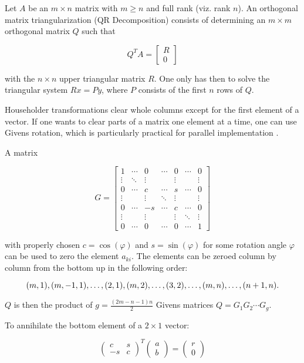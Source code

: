 \documentclass{article}
\begin{document}
Let $A$ be an $m \times n$ matrix with $m \ge n$  and full rank (viz. rank $n$). An orthogonal matrix triangularization (QR Decomposition) consists of determining an $m \times m$ orthogonal matrix $Q$ such that

$$ Q^T A = \begin{bmatrix} R \\ 0 \end{bmatrix} $$

with the $n \times n$ upper triangular matrix $R$. One only has then to solve the triangular system $Rx = Py$, where $P$ consists of the first $n$ rows of $Q$.

Householder transformations clear whole columns except for the first element of a vector. If one wants to clear parts of a matrix one element at a time, one can use Givens rotation, which is particularly practical for parallel implementation .

A matrix

$$ G = \begin{bmatrix}
1 & \cdots & 0 & \cdots & 0 & \cdots & 0 \\
\vdots & \ddots & \vdots & \; & \vdots & \; & \vdots \\
0 & \cdots & c & \cdots & s & \cdots & 0 \\
\vdots & \; & \vdots & \ddots & \vdots & \; & \vdots \\
0 & \cdots & -s & \cdots & c & \cdots & 0 \\
\vdots & \; & \vdots & \; & \vdots & \ddots & \vdots \\
0 & \cdots & 0 & \cdots & 0 & \cdots & 1 
\end{bmatrix} $$

with properly chosen $c=\cos(\varphi)$ and $s=\sin(\varphi)$ for some rotation angle $\varphi$ can be used to zero the element $a_{ki}$. The elements can be zeroed column by column from the bottom up in the following order:

$$(m,1),(m,-1,1),\ldots,(2,1),(m,2),\ldots, \\
 (3,2),\ldots,(m,n),\ldots,(n+1,n).$$

$Q$ is then the product of $g = \frac{\left( 2m -n -1 \right)n}{2}$ Givens matrices $Q=G_1G_2\cdots G_g$.

To annihilate the bottom element of a $2 \times 1$ vector:

$$ \begin{pmatrix}c & s \\ -s & c\end{pmatrix}^T \begin{pmatrix} a \\ b \end{pmatrix} = \begin{pmatrix}r \\ 0\end{pmatrix} $$
\end{document}
